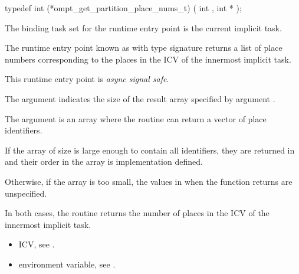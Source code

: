 \format
\begin{ccppspecific}
\begin{omptInquiry}
typedef int (*ompt_get_partition_place_nums_t) (
  int ,
  int *
);
\end{omptInquiry}
\end{ccppspecific}

\binding
The binding task set for the  runtime 
entry point is the current implicit task.

\descr
The runtime entry point known as
 with type signature
 returns a list of place
numbers corresponding to the places in the 
ICV of the innermost implicit task.

This runtime entry point is \emph{async signal safe}.

\argdesc

The argument  indicates the size of the result
array specified by argument .

The argument  is an array where the routine can return
a vector of place identifiers.

\effect

If the array  of size  is
large enough to contain all identifiers, they are returned in
 and their order in the array is implementation
defined.

Otherwise, if the  array is too small, the values in  when the function returns are unspecified.

In both cases, the routine returns the number of places in the
 ICV of the innermost implicit task.

\crossreferences
\begin{itemize}
\item {} ICV, see
.

\item {} environment variable, see
.

\end{itemize}





\label{sec:ompt_get_proc_id_t}
\label{sec:ompt_get_proc_id}

